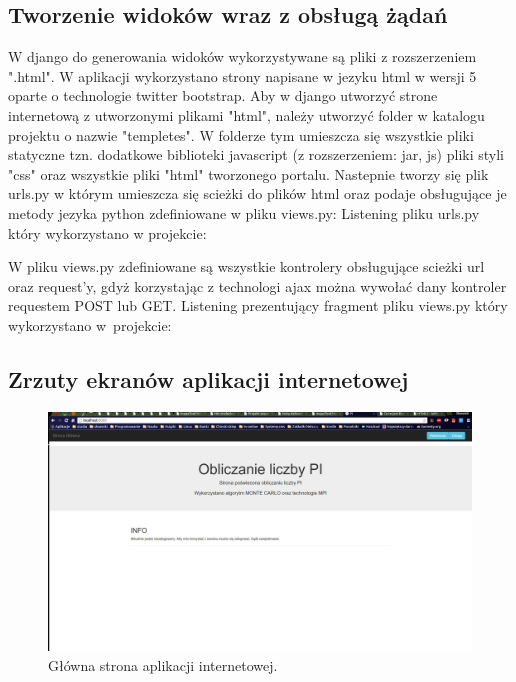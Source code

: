 \documentclass[a4paper,12pt]{article}		%
\begin{document}
\subsection{Tworzenie widoków wraz z obsługą żądań}
W django do generowania widoków wykorzystywane są pliki z rozszerzeniem ".html". W aplikacji wykorzystano strony napisane w jezyku html w wersji 5 oparte o technologie twitter bootstrap.
Aby w django utworzyć strone internetową z utworzonymi plikami "html", należy utworzyć folder w katalogu projektu o nazwie "templetes". W folderze tym umieszcza się wszystkie pliki statyczne tzn. dodatkowe biblioteki javascript (z rozszerzeniem: jar, js) pliki styli "css" oraz wszystkie pliki "html" tworzonego portalu.
Nastepnie tworzy się plik urls.py w którym umieszcza się scieżki do plików html oraz podaje obsługujące je metody jezyka python zdefiniowane w pliku views.py:
Listening pliku urls.py który wykorzystano w projekcie:



W pliku views.py zdefiniowane są wszystkie kontrolery obsługujące scieżki url oraz request'y, gdyż korzystając z technologi ajax można wywołać dany kontroler requestem POST lub GET.
Listening prezentujący fragment pliku views.py który wykorzystano w~projekcie:



\subsection{Zrzuty ekranów aplikacji internetowej}

\begin{center}
\begin{figure}[h!]
\centering
\includegraphics[scale=0.2]{Resources/mainSite.jpg}
\caption{Główna strona aplikacji internetowej.} 
\end{figure} 
\end{center}
\end{document}
